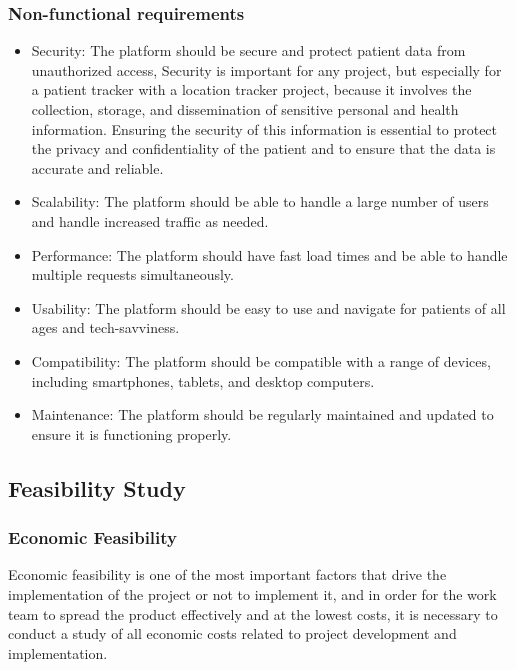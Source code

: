 \documentclass[12pt]{article}
\begin{document}
			\subsubsection{Non-functional requirements}
				\begin{itemize}
					\item Security: The platform should be secure and protect patient data from unauthorized access, 
					Security is important for any project, but especially for a patient tracker with a location tracker project, because it involves the collection, storage, and dissemination of sensitive personal and health information. Ensuring the security of this information is essential to protect the privacy and confidentiality of the patient and to ensure that the data is accurate and reliable.
					\item Scalability: The platform should be able to handle a large number of users and handle increased traffic as needed.
					\item Performance: The platform should have fast load times and be able to handle multiple requests simultaneously.
					\item Usability: The platform should be easy to use and navigate for patients of all ages and tech-savviness.
					\item Compatibility: The platform should be compatible with a range of devices, including smartphones, tablets, and desktop computers.
					\item Maintenance: The platform should be regularly maintained and updated to ensure it is functioning properly.
				\end{itemize}
		
		\subsection{Feasibility Study}
			\subsubsection{Economic Feasibility}
			
				\quad Economic feasibility is one of the most important factors that drive the implementation of the project or not to implement it, and in order for the work team to spread the product effectively and at the lowest costs, it is necessary to conduct a study of all economic costs related to project development and implementation.
				
\end{document}
